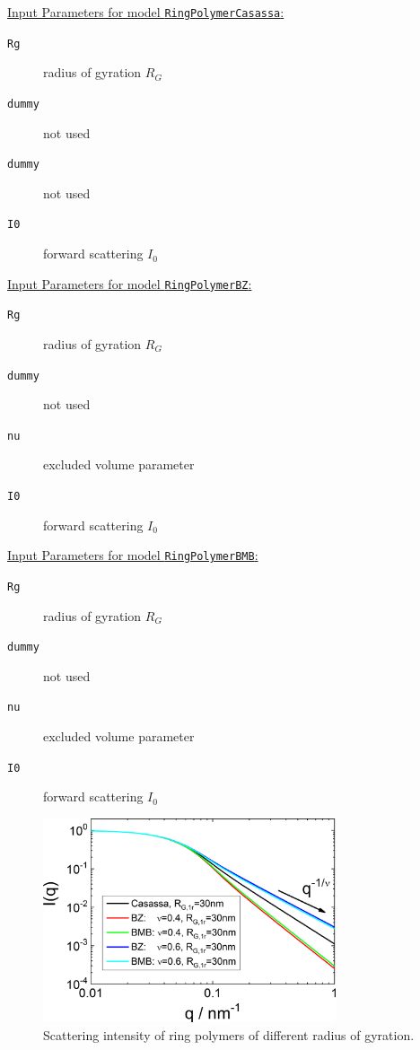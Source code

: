 \vspace{5mm}

\noindent
\underline{Input Parameters for model \texttt{RingPolymerCasassa}:}
\begin{description}
\item[\texttt{Rg}] radius of gyration $R_G$
\item[\texttt{dummy}] not used
\item[\texttt{dummy}] not used
\item[\texttt{I0}] forward scattering $I_0$
\end{description}

\noindent
\underline{Input Parameters for model \texttt{RingPolymerBZ}:}
\begin{description}
\item[\texttt{Rg}] radius of gyration $R_G$
\item[\texttt{dummy}] not used
\item[\texttt{nu}] excluded volume parameter
\item[\texttt{I0}] forward scattering $I_0$
\end{description}

\noindent
\underline{Input Parameters for model \texttt{RingPolymerBMB}:}
\begin{description}
\item[\texttt{Rg}] radius of gyration $R_G$
\item[\texttt{dummy}] not used
\item[\texttt{nu}] excluded volume parameter
\item[\texttt{I0}] forward scattering $I_0$
\end{description}

\begin{figure}[htb]
\begin{center}
\includegraphics[width=0.768\textwidth]{../images/form_factor/polymer_rings/ringIQ.png}
\end{center}
\caption{Scattering intensity of ring polymers of different radius of gyration.} \label{fig:ringIQ}
\end{figure}

